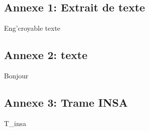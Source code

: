 \documentclass[a4paper,11pt,twoside]{article} %
\begin{document}
\clearpage
{}

\subsection{Annexe 1: Extrait de texte}
Eng'croyable texte
\clearpage

\subsection{Annexe 2: texte}
Bonjour
\clearpage

\subsection{Annexe 3: Trame INSA}
 {T_insa}
\clearpage

\end{document}
